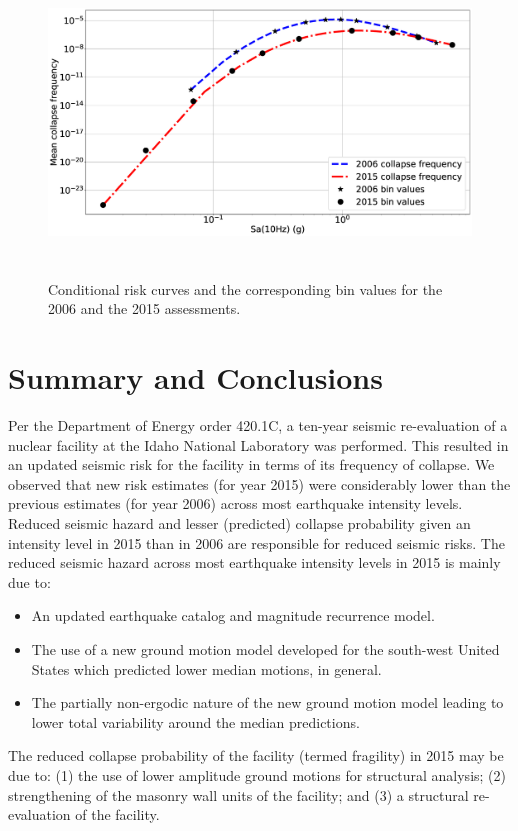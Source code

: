 \documentclass[3p]{elsarticle}
\begin{document}
\begin{figure}[H]
\centering
\includegraphics[width=5.5in, height = 3.2in]{Risk_PGA.eps}
\caption{Conditional risk curves and the corresponding bin values for the 2006 and the 2015 assessments.}\label{fig:Risk}
\end{figure}

\section{Summary and Conclusions}

Per the Department of Energy order 420.1C, a ten-year seismic re-evaluation of a nuclear facility at the Idaho National Laboratory was performed. This resulted in an updated seismic risk for the facility in terms of its frequency of collapse. We observed that new risk estimates (for year 2015) were considerably lower than the previous estimates (for year 2006) across most earthquake intensity levels. Reduced seismic hazard and lesser (predicted) collapse probability given an intensity level in 2015 than in 2006 are responsible for reduced seismic risks. The reduced seismic hazard across most earthquake intensity levels in 2015 is mainly due to:
\begin{itemize}
    \item An updated earthquake catalog and magnitude recurrence model.
    \item The use of a new ground motion model developed for the south-west United States which predicted lower median motions, in general.
    \item The partially non-ergodic nature of the new ground motion model leading to lower total variability around the median predictions.
\end{itemize}

\noindent The reduced collapse probability of the facility (termed fragility) in 2015 may be due to: (1) the use of lower amplitude ground motions for structural analysis; (2) strengthening of the masonry wall units of the facility; and (3) a structural re-evaluation of the facility.


\end{document}
